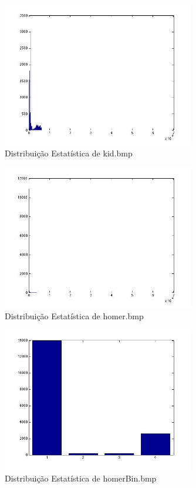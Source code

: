 \documentclass[12pt]{article}
\begin{document}
  \begin{figure}[H]
    \centering
      \includegraphics[width=0.75\textwidth]{ex5kid}
    \caption{Distribuição Estatística de kid.bmp}
  \end{figure}

  \begin{figure}[H]
    \centering
      \includegraphics[width=0.75\textwidth]{ex5homer}
    \caption{Distribuição Estatística de homer.bmp}
  \end{figure}

  \begin{figure}[H]
    \centering
      \includegraphics[width=0.75\textwidth]{ex5homerbin}
    \caption{Distribuição Estatística de homerBin.bmp}
  \end{figure}
\end{document}
